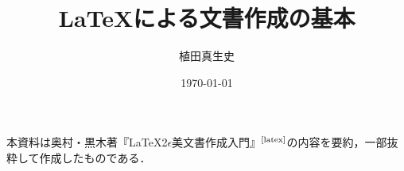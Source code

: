 \documentclass[uplatex,dvipdfmx]{jsarticle}
\begin{document}
\title{\LaTeX による文書作成の基本}
\author{植田真生史}
\date{\today}

\maketitle

本資料は奥村・黒木著『\LaTeX 2$\epsilon$美文書作成入門』$^\text{\cite{latex}}$の内容を要約，一部抜粋して作成したものである．

\vspace{1cm}
\tableofcontents
\clearpage


\clearpage

\clearpage

\clearpage

\clearpage

\clearpage

\clearpage



\end{document}
